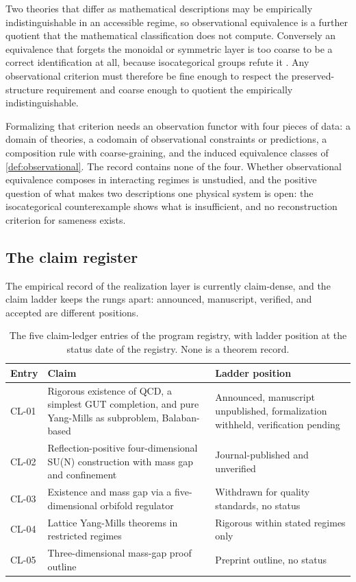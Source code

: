 \documentclass[11pt,letterpaper]{article}
\theoremstyle{definition}
\begin{document}
Two theories that differ as mathematical descriptions may be empirically indistinguishable in an accessible regime, so observational equivalence is a further quotient that the mathematical classification does not compute. Conversely an equivalence that forgets the monoidal or symmetric layer is too coarse to be a correct identification at all, because isocategorical groups refute it \cite{corpus-12}. Any observational criterion must therefore be fine enough to respect the preserved-structure requirement and coarse enough to quotient the empirically indistinguishable.

Formalizing that criterion needs an observation functor with four pieces of data: a domain of theories, a codomain of observational constraints or predictions, a composition rule with coarse-graining, and the induced equivalence classes of \cref{def:observational}. The record contains none of the four. Whether observational equivalence composes in interacting regimes is unstudied, and the positive question of what makes two descriptions one physical system is open: the isocategorical counterexample shows what is insufficient, and no reconstruction criterion for sameness exists.

\subsection{The claim register}

The empirical record of the realization layer is currently claim-dense, and the claim ladder keeps the rungs apart: announced, manuscript, verified, and accepted are different positions.

\begin{table}[htbp]
\caption{The five claim-ledger entries of the program registry, with ladder position at the status date of the registry. None is a theorem record.}
\label{tab:claims}
\small
\begin{tabularx}{\textwidth}{>{\hsize=0.25\hsize\raggedright\arraybackslash}X >{\hsize=1.23\hsize\raggedright\arraybackslash}X >{\hsize=1.52\hsize\raggedright\arraybackslash}X}
\toprule
Entry & Claim & Ladder position \\
\midrule
CL-01 & Rigorous existence of QCD, a simplest GUT completion, and pure Yang-Mills as subproblem, Balaban-based \cite{corpus-24,corpus-25,corpus-26} & Announced, manuscript unpublished, formalization withheld, verification pending \\
CL-02 & Reflection-positive four-dimensional SU(N) construction with mass gap and confinement \cite{corpus-28} & Journal-published and unverified \\
CL-03 & Existence and mass gap via a five-dimensional orbifold regulator \cite{corpus-29} & Withdrawn for quality standards, no status \\
CL-04 & Lattice Yang-Mills theorems in restricted regimes \cite{corpus-30,corpus-31,corpus-32} & Rigorous within stated regimes only \\
CL-05 & Three-dimensional mass-gap proof outline \cite{corpus-33} & Preprint outline, no status \\
\bottomrule
\end{tabularx}
\end{table}
\end{document}
